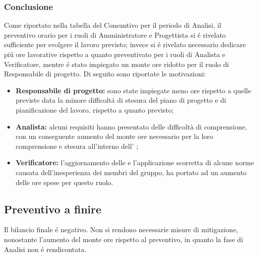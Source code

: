 	\subsubsection{Conclusione}
		Come riportato nella tabella del Consuntivo per il periodo di Analisi, il preventivo orario per i ruoli di Amministratore e Progettista si é rivelato sufficiente per svolgere il lavoro previsto; invece si é rivelato necessario dedicare piú ore lavorative rispetto a quanto preventivato per i ruoli di Analista e Verificatore, mentre é stato impiegato un monte ore ridotto per il ruolo di Responsabile di progetto. Di seguito sono riportate le motivazioni:
		\begin{itemize}
			\item \textbf{Responsabile di progetto:} sono state impiegate meno ore rispetto a quelle previste data la minore difficoltá di stesura del piano di progetto e di pianificazione del lavoro, rispetto a quanto previsto;
			\item \textbf{Analista:} alcuni requisiti hanno presentato delle difficoltà di comprensione, con un conseguente aumento del monte ore necessario per la loro comprensione e stesura all'interno dell' \AdR{};
			\item \textbf{Verificatore:} l'aggiornamento delle \NdP{} e l'applicazione scorretta di alcune norme causata dell'inesperienza dei membri del gruppo, ha portato ad un aumento delle ore spese per questo ruolo.
		\end{itemize}

\subsection{Preventivo a finire}
Il bilancio finale é negativo.
Non si rendono necessarie misure di mitigazione, nonostante l'aumento del monte ore rispetto al preventivo, in quanto la fase di Analisi non é rendicontata.
